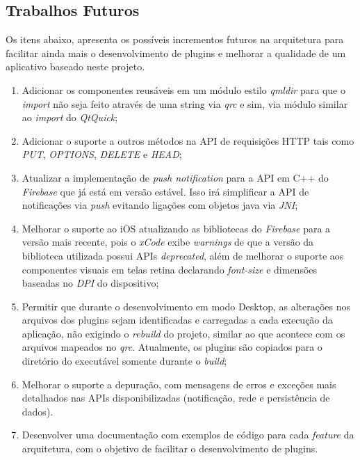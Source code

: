 \subsection{Trabalhos Futuros}
Os itens abaixo, apresenta os possíveis incrementos futuros na arquitetura para facilitar ainda mais o desenvolvimento de plugins e melhorar a qualidade de um aplicativo baseado neste projeto.

\begin{enumerate}
	\item Adicionar os componentes reusáveis em um módulo estilo \textit{qmldir} para que o \textit{import} não seja feito através de uma string via \textit{qrc} e sim, via módulo similar ao \textit{import} do \textit{QtQuick};

	\item Adicionar o suporte a outros métodos na API de requisições HTTP tais como \textit{PUT}, \textit{OPTIONS}, \textit{DELETE} e \textit{HEAD};

	\item Atualizar a implementação de \textit{push notification} para a API em C++ do \textit{Firebase} que já está em versão estável. Isso irá simplificar a API de notificações via \textit{push} evitando ligações com objetos java via \textit{JNI};

	\item Melhorar o suporte ao iOS atualizando as bibliotecas do \textit{Firebase} para a versão mais recente, pois o \textit{xCode} exibe \textit{warnings} de que a versão da biblioteca utilizada possui APIs \textit{deprecated}, além de melhorar o suporte aos componentes visuais em telas retina declarando \textit{font-size} e dimensões baseadas no \textit{DPI} do dispositivo;

	\item Permitir que durante o desenvolvimento em modo Desktop, as alterações nos arquivos dos plugins sejam identificadas e carregadas a cada execução da aplicação, não exigindo o \textit{rebuild} do projeto, similar ao que acontece com os arquivos mapeados no \textit{qrc}. Atualmente, os plugins são copiados para o diretório do executável somente durante o \textit{build};

	\item Melhorar o suporte a depuração, com mensagens de erros e exceções mais detalhados nas APIs disponibilizadas (notificação, rede e persistência de dados).

	\item Desenvolver uma documentação com exemplos de código para cada \textit{feature} da arquitetura, com o objetivo de facilitar o desenvolvimento de plugins.
\end{enumerate}